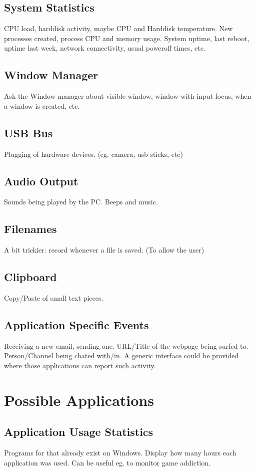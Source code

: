 \documentclass[]{article}
\begin{document}
\subsection{System Statistics}
CPU load, harddisk activity, maybe CPU and Harddisk temperature.  New
processes created, process CPU and memory usage. System uptime, last
reboot, uptime last week, network connectivity, usual poweroff times,
etc.

\subsection{Window Manager}
Ask the Window manager about visible window, window with input focus,
when a window is created, etc.

\subsection{USB Bus}
Plugging of hardware devices. (eg. camera, usb sticks, etc)

\subsection{Audio Output}
Sounds being played by the PC. Beeps and music.

\subsection{Filenames}
A bit trickier: record whenever a file is saved. (To allow the user)

\subsection{Clipboard}
Copy/Paste of small text pieces.

\subsection{Application Specific Events}
Receiving a new email, sending one. URL/Title of the webpage being
surfed to. Person/Channel being chated with/in. A generic interface
could be provided where those applications can report such activity.

\section{Possible Applications}

\subsection{Application Usage Statistics}
Programs for that already exist on Windows. Display how many hours
each application was used. Can be useful eg. to monitor game
addiction.
\end{document}
